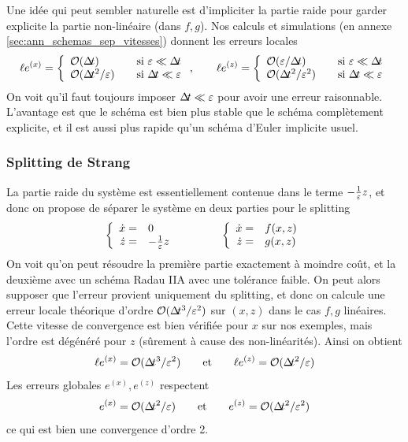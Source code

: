 Une idée qui peut sembler naturelle est d'impliciter la partie raide pour garder explicite la partie non-linéaire (dans $f,g$). 
Nos calculs et simulations (en annexe \ref{sec:ann_schemas_sep_vitesses}) donnent les erreurs locales 
$$ \lex = \left\{ \begin{array}{ll} 
\O(\dt) &\quad \text{si } \epsilon\ll\dt \\ 
\O(\dt^2/\epsilon) &\quad \text{si } \dt\ll\epsilon 
\end{array} \right. ,
\qquad \lez = \left\{ \begin{array}{ll} 
\O(\epsilon/\dt) &\quad \text{si } \epsilon\ll\dt \\
\O(\dt^2/\epsilon^2) &\quad \text{si } \dt\ll\epsilon
\end{array} \right. $$
On voit qu'il faut toujours imposer $\Delta\!\!\!\ t\ll\varepsilon$ pour avoir une erreur raisonnable. 
L'avantage est que le schéma est bien plus stable que le schéma complètement explicite, et il est aussi plus rapide qu'un schéma d'Euler implicite usuel. 

\subsubsection{Splitting de Strang}

La partie raide du système est essentiellement contenue dans le terme $-\frac{1}{\varepsilon} z$, et donc on propose de séparer le système en deux parties pour le splitting 
$$ \left\{\begin{array}{rl}
\dot x = & 0 \\ \dot z =& -\frac{1}{\varepsilon} z
\end{array}\right. \qquad\qquad 
\left\{\begin{array}{rl}
\dot x = & f(x,z) \\ \dot z =& g(x,z)
\end{array}\right. $$
On voit qu'on peut résoudre la première partie exactement à moindre coût, et la deuxième avec un schéma Radau IIA avec une tolérance faible. 
On peut alors supposer que l'erreur provient uniquement du splitting, et donc on calcule une erreur locale théorique d'ordre $\mathcal{O}(\Delta\!\!\!\ t^3/\varepsilon^2)$ sur $(x,z)$ dans le cas $f,g$ linéaires. 
Cette vitesse de convergence est bien vérifiée pour $x$ sur nos exemples, mais l'ordre est dégénéré pour $z$ (sûrement à cause des non-linéarités). 
Ainsi on obtient 
$$ \ell e^{(x)} = \mathcal{O}(\Delta\!\!\!\ t^3/\varepsilon^2) \qquad \text{et} \qquad 
\ell e^{(z)} = \mathcal{O}(\Delta\!\!\!\ t^2/\varepsilon) $$
Les erreurs globales $e^{(x)},e^{(z)}$ respectent 
$$ e^{(x)} = \mathcal{O}(\Delta\!\!\!\ t^2/\varepsilon) \qquad \text{et} \qquad e^{(z)} = \mathcal{O}(\Delta\!\!\!\ t^2/\varepsilon^2) $$
ce qui est bien une convergence d'ordre 2. 


